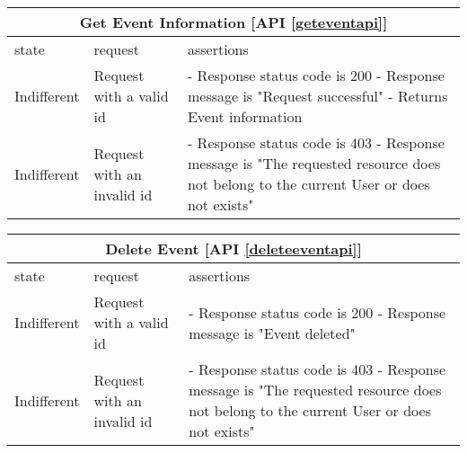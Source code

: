 \begin{center}
	\begin{tabular}{|p{}|p{}|p{}|}
		\hline
		\multicolumn{3}{c}{Get Event Information [API \ref{geteventapi}]}\\
		
		\hline
		state & request & assertions \\
		
		
		\hline
		Indifferent &
		Request with a valid id & 
		- Response status code is 200 \newline
		- Response message is "Request successful" \newline
		- Returns Event information
		\\
		
		\hline
		Indifferent &
		Request with an invalid id  & 
		- Response status code is 403 \newline
		- Response message is "The requested resource does not belong to the current User or does not exists" \newline
		\\
		
		\hline
		
	\end{tabular}
\end{center}

\begin{center}
	\begin{tabular}{|p{}|p{}|p{}|}
		\hline
		\multicolumn{3}{c}{Delete Event [API \ref{deleteeventapi}]}\\
		
		\hline
		state & request & assertions \\
		
		
		\hline
		Indifferent &
		Request with a valid id & 
		- Response status code is 200 \newline
		- Response message is "Event deleted" \newline
		\\
		
		\hline
		Indifferent &
		Request with an invalid id  & 
		- Response status code is 403 \newline
		- Response message is "The requested resource does not belong to the current User or does not exists" \newline
		\\
		
		\hline
		
	\end{tabular}
\end{center}

